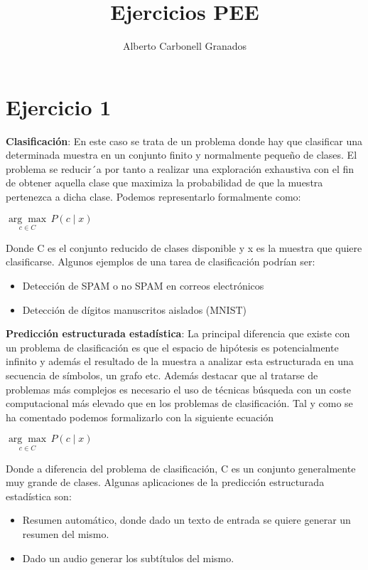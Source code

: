 \documentclass[10pt,a4paper]{article}
\author{Alberto Carbonell Granados}
\begin{document}
	\title{Ejercicios PEE}
	\maketitle
	
	\newpage
	\section{Ejercicio 1}
	\textbf{Clasificación}: En este caso se trata de un problema donde hay que clasificar
	una determinada muestra en un conjunto finito y normalmente pequeño de
	clases. El problema se reducir´a por tanto a realizar una exploración exhaustiva
	con el fin de obtener aquella clase que maximiza la probabilidad de que la
	muestra pertenezca a dicha clase. Podemos representarlo formalmente como:

	\begin{center}
		$\underset{c \in C}{\arg\max}\,{P(c \mid x)}$
	\end{center}

	Donde C es el conjunto reducido de clases disponible y x es la muestra que
	quiere clasificarse.
	Algunos ejemplos de una tarea de clasificación podrían ser:
	\begin{itemize}
		\item Detección de SPAM o no SPAM en correos electrónicos
		\item Detección de dígitos manuscritos aislados (MNIST)
	\end{itemize}
	\textbf{Predicción estructurada estadística}: La principal diferencia que existe
	con un problema de clasificación es que el espacio de hipótesis es potencialmente
	infinito y además el resultado de la muestra a analizar esta estructurada en
	una secuencia de símbolos, un grafo etc. Además destacar que al tratarse de
	problemas más complejos es necesario el uso de técnicas búsqueda con un coste
	computacional más elevado que en los problemas de clasificación. Tal y como
	se ha comentado podemos formalizarlo con la siguiente ecuación
	\begin{center}
		$\underset{c \in C}{\arg\max}\,{P(c \mid x)}$
	\end{center}
	Donde a diferencia del problema de clasificación, C es un conjunto generalmente
	muy grande de clases. Algunas aplicaciones de la predicción estructurada estadística son:
	\begin{itemize}
		\item Resumen automático, donde dado un texto de entrada se quiere generar
		un resumen del mismo.
		\item Dado un audio generar los subtítulos del mismo.
	\end{itemize}
\end{document}
